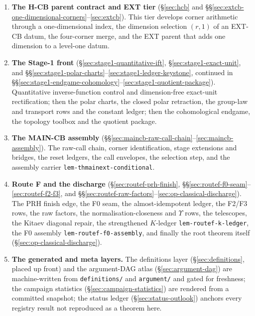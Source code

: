 \begin{enumerate}
\item \textbf{The H-CB parent contract and EXT tier} (\S\ref{sec:hcb} and
  \S\S\ref{sec:extcb-one-dimensional-corners}--\ref{sec:extcb}). This tier develops
  corner arithmetic through a one-dimensional index, the dimension selection $(r,1)$
  of an EXT-CB datum, the four-corner merge, and the EXT parent that adds one dimension
  to a level-one datum.

\item \textbf{The Stage-1 front} (\S\ref{sec:stage1-quantitative-ift},
  \S\ref{sec:stage1-exact-unit}, and
  \S\S\ref{sec:stage1-polar-charts}--\ref{sec:stage1-ledger-keystone}, continued in
  \S\S\ref{sec:stage1-endgame-cohomology}--\ref{sec:stage1-quotient-package}).
  Quantitative inverse-function control and dimension-free exact-unit rectification;
  then the polar charts, the closed polar retraction, the group-law and transport rows
  and the constant ledger; then the cohomological endgame, the topology toolbox and the
  quotient package.

\item \textbf{The MAIN-CB assembly}
  (\S\S\ref{sec:maincb-raw-call-chain}--\ref{sec:maincb-assembly}). The raw-call chain,
  corner identification, stage extensions and bridges, the reset ledgers, the call
  envelopes, the selection step, and the assembly carrier
  \texttt{lem-thmainext-conditional}.

\item \textbf{Route F and the discharge} (\S\ref{sec:routef-prh-finish},
  \S\S\ref{sec:routef-f0-seam}--\ref{sec:routef-f2-f3}, and
  \S\S\ref{sec:routef-raw-factors}--\ref{sec:op-classical-discharge}). The PRH finish
  edge, the F0 seam, the almost-idempotent ledger, the F2/F3 rows, the raw factors,
  the normalisation-closeness and $\Upsilon$ rows, the telescopes, the Kitaev diagonal
  repair, the strengthened $K$-ledger \texttt{lem-routef-k-ledger}, the F0 assembly
  \texttt{lem-routef-f0-assembly}, and finally the root theorem itself
  (\S\ref{sec:op-classical-discharge}).

\item \textbf{The generated and meta layers.} The definitions layer
  (\S\ref{sec:definitions}, placed up front) and the argument-DAG atlas
  (\S\ref{sec:argument-dag}) are machine-written from \texttt{definitions/} and
  \texttt{argument/} and gated for freshness; the campaign statistics
  (\S\ref{sec:campaign-statistics}) are rendered from a committed snapshot; the status
  ledger (\S\ref{sec:status-outlook}) anchors every registry result not reproduced as a
  theorem here.
\end{enumerate}


